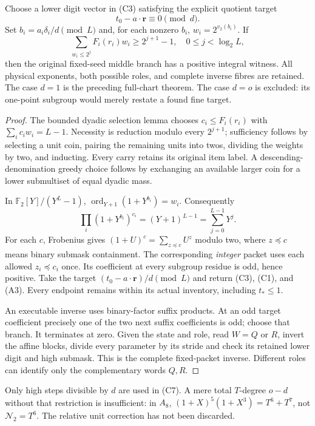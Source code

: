\begin{theorem}\label{thm:lift}
Choose a lower digit vector in (C3) satisfying the explicit quotient target
\[
 t_0-a\cdot\mathbf r\equiv0\pmod d.                        \tag{C5}
\]
Set $b_i=a_i\delta_i/d\pmod L$ and, for each nonzero $b_i$,
$w_i=2^{v_2(b_i)}$. If
\[
 \boxed{\sum_{w_i\le2^j}F_i(r_i)w_i\ge2^{j+1}-1,
        \quad0\le j<\log_2L,}                             \tag{C6}
\]
then the original fixed-seed middle branch has a positive integral witness.
All physical exponents, both possible roles, and complete inverse fibres are
retained. The case $d=1$ is the preceding full-chart theorem. The case $d=o$
is excluded: its one-point subgroup would merely restate a found fine target.
\end{theorem}
\begin{proof}
The bounded dyadic selection lemma chooses $c_i\le F_i(r_i)$ with
$\sum_i c_iw_i=L-1$. Necessity is reduction modulo every $2^{j+1}$;
sufficiency follows by selecting a unit coin, pairing the remaining units into
twos, dividing the weights by two, and inducting. Every carry retains its
original item label. A descending-denomination greedy choice follows by exchanging
an available larger coin for a lower submultiset of equal dyadic mass.

In $\mathbb F_2[Y]/(Y^L-1)$, $\operatorname{ord}_{Y+1}(1+Y^{b_i})=w_i$.
Consequently
\[
 \prod_i(1+Y^{b_i})^{c_i}=(Y+1)^{L-1}=\sum_{j=0}^{L-1}Y^j. \tag{C7}
\]
For each $c$, Frobenius gives $(1+U)^c=\sum_{z\preceq c}U^z$ modulo two,
where $z\preceq c$ means binary submask containment. The corresponding
\emph{integer} packet uses each allowed $z_i\preceq c_i$ once. Its coefficient
at every subgroup residue is odd, hence positive. Take the target
$(t_0-a\cdot\mathbf r)/d\pmod L$ and return (C3), (C1), and (A3).
Every endpoint remains within its actual inventory, including $t_*\le1$.

An executable inverse uses binary-factor suffix products. At an odd target
coefficient precisely one of the two next suffix coefficients is odd; choose
that branch. It terminates at zero. Given the state and role, read $W=Q$ or
$R$, invert the affine blocks, divide every parameter by its stride and check
its retained lower digit and high submask. This is the complete fixed-packet
inverse. Different roles can identify only the complementary words $Q,R$.
\end{proof}

Only high steps divisible by $d$ are used in (C7). A mere total $T$-degree
$o-d$ without that restriction is insufficient: in $A_8$,
$(1+X)^5(1+X^3)=T^6+T^7$, not $\mathcal N_2=T^6$.
The relative unit correction has not been discarded.

